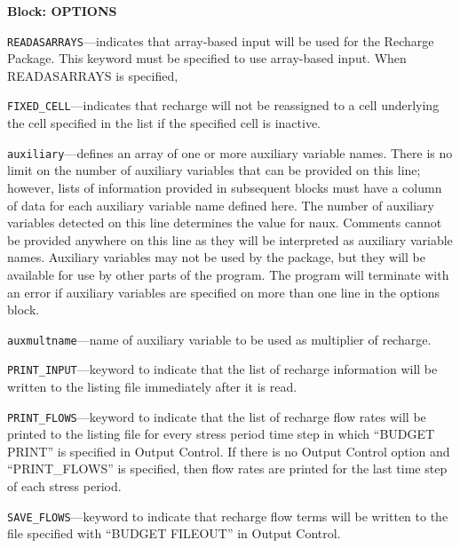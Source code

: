 
\item \textbf{Block: OPTIONS}

\begin{description}
\item \texttt{READASARRAYS}---indicates that array-based input will be used for the Recharge Package.  This keyword must be specified to use array-based input.  When READASARRAYS is specified,

\item \texttt{FIXED\_CELL}---indicates that recharge will not be reassigned to a cell underlying the cell specified in the list if the specified cell is inactive.

\item \texttt{auxiliary}---defines an array of one or more auxiliary variable names.  There is no limit on the number of auxiliary variables that can be provided on this line; however, lists of information provided in subsequent blocks must have a column of data for each auxiliary variable name defined here.   The number of auxiliary variables detected on this line determines the value for naux.  Comments cannot be provided anywhere on this line as they will be interpreted as auxiliary variable names.  Auxiliary variables may not be used by the package, but they will be available for use by other parts of the program.  The program will terminate with an error if auxiliary variables are specified on more than one line in the options block.

\item \texttt{auxmultname}---name of auxiliary variable to be used as multiplier of recharge.

\item \texttt{PRINT\_INPUT}---keyword to indicate that the list of recharge information will be written to the listing file immediately after it is read.

\item \texttt{PRINT\_FLOWS}---keyword to indicate that the list of recharge flow rates will be printed to the listing file for every stress period time step in which ``BUDGET PRINT'' is specified in Output Control.  If there is no Output Control option and ``PRINT\_FLOWS'' is specified, then flow rates are printed for the last time step of each stress period.

\item \texttt{SAVE\_FLOWS}---keyword to indicate that recharge flow terms will be written to the file specified with ``BUDGET FILEOUT'' in Output Control.


\end{description}

